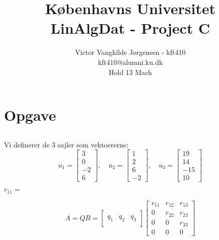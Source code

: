 \documentclass[a4paper,12pt]{article}
\title{Københavns Universitet\\
LinAlgDat - Project C}
\author{Victor Vangkilde Jørgensen - kft410\\ 
kft410@alumni.ku.dk\\
Hold 13 Mach}
\begin{document}
 
 
\maketitle 

\section[Opgave]{Opgave}
\subsection{}

Vi definerer de 3 søjler som vektoererne:
\[
u_1 = \left[\begin{array}{c}
    3\\
    0\\
    -2\\
    6
\end{array}\right], \quad
u_2 = \left[\begin{array}{c}
    1\\
    2\\
    6\\
    -2
\end{array}\right], \quad
u_3 = \left[\begin{array}{c}
    19\\
    14\\
    -15\\
    10
\end{array}\right]
\]

$
r_{11} = 
$

\[
A = QR = 
\left[\begin{array}{c|c|c}
     &  & \\
    q_1 & q_2 & q_3 \\
     &  & 
\end{array}\right]
\left[\begin{array}{ccc}
    r_{11} & r_{12} & r_{13}\\
    0 & r_{22} & r_{23} \\
    0 & 0 & r_{33}\\
    0 & 0 & 0
\end{array}\right]
\]

\subsection{}


\subsection{}
\end{document}
